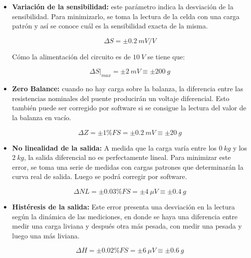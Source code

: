 \documentclass[12pt,A4paper,titlepage]{article}
\begin{document}
\begin{itemize}
    \item \textbf{Variación de la sensibilidad:} este parámetro indica la desviación de la sensibilidad. Para minimizarlo, se toma la lectura de la celda con una carga patrón y así se conoce cuál es la sensibilidad exacta de la misma. 
    
    \begin{equation}
        \Delta S =\pm 0.2~mV/V
    \end{equation}

    Cómo la alimentación del circuito es de \(10~V\) se tiene que:
    
    \begin{equation}
        \Delta S|_{max}=\pm 2~mV\equiv \pm 200~g
    \end{equation}
    
    \bigskip
    \item \textbf{Zero Balance:} cuando no hay carga sobre la balanza, la diferencia entre las resistencias nominales del puente producirán un voltaje diferencial. Esto también puede ser corregido por software si se consigue la lectura del valor de la balanza en vacío. 
    
    \begin{equation}
        \Delta Z=\pm 1 \%FS = \pm 0.2~mV \equiv \pm 20~g
    \end{equation}
    
    \bigskip
    \item \textbf{No linealidad de la salida:} A medida que la carga varía entre los \(0~kg\) y los \(2~kg\), la salida diferencial no es perfectamente lineal. Para minimizar este error, se toma una serie de medidas con cargas patrones que determinarán la curva real de salida. Luego se podrá corregir por software.
    
    \begin{equation}
        \Delta NL = \pm 0.03 \%FS = \pm 4~\mu V \equiv \pm 0.4~g
    \end{equation}

    \bigskip
    \item \textbf{Histéresis de la salida:} Este error presenta una desviación en la lectura según la dinámica de las mediciones, en donde se haya una diferencia entre medir una carga liviana y después otra más pesada, con medir una pesada y luego una más liviana. 
    
    \begin{equation}
        \Delta H =\pm 0.02 \% FS = \pm 6~\mu V \equiv \pm 0.6~g
    \end{equation}


\end{itemize}
\end{document}
